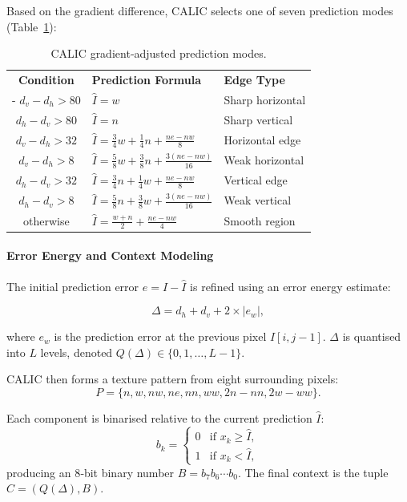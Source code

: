 Based on the gradient difference, CALIC selects one of seven prediction modes (Table~\ref{tab:calic_modes}):

\begin{table}[H]
\centering
\caption{CALIC gradient‑adjusted prediction modes.}
\label{tab:calic_modes}
\begin{tabular}{|c|l|l|}
\hline
\textbf{Condition} & \textbf{Prediction Formula} & \textbf{Edge Type} \\
-\hline 
\(d_v - d_h > 80\) & \(\hat{I} = w\) & Sharp horizontal \\
\(d_h - d_v > 80\) & \(\hat{I} = n\) & Sharp vertical \\
\(d_v - d_h > 32\) & \(\hat{I} = \frac{3}{4}w + \frac{1}{4}n + \frac{ne - nw}{8}\) & Horizontal edge \\
\(d_v - d_h > 8\)  & \(\hat{I} = \frac{5}{8}w + \frac{3}{8}n + \frac{3(ne - nw)}{16}\) & Weak horizontal \\
\(d_h - d_v > 32\) & \(\hat{I} = \frac{3}{4}n + \frac{1}{4}w + \frac{ne - nw}{8}\) & Vertical edge \\
\(d_h - d_v > 8\)  & \(\hat{I} = \frac{5}{8}n + \frac{3}{8}w + \frac{3(ne - nw)}{16}\) & Weak vertical \\
otherwise & \(\hat{I} = \frac{w + n}{2} + \frac{ne - nw}{4}\) & Smooth region \\
\hline
\end{tabular}
\end{table}

\paragraph{Error Energy and Context Modeling}
The initial prediction error \(e = I - \hat{I}\) is refined using an error energy estimate\cite{Wu1996}:

\[ 
\Delta = d_h + d_v + 2 \times |e_w|,
\]

where \(e_w\) is the prediction error at the previous pixel \(I[i, j-1]\). \(\Delta\) is quantised into \(L\) levels, denoted \(Q(\Delta) \in \{0,1,\ldots,L-1\}\).

CALIC then forms a texture pattern from eight surrounding pixels:
\[
P = \{n, w, nw, ne, nn, ww, 2n - nn, 2w - ww\}. 
\]

Each component is binarised relative to the current prediction  \(\hat{I}\):
\[
b_k = \begin{cases}
0 & \text{if } x_k \ge \hat{I},\\
1 & \text{if } x_k < \hat{I},
\end{cases} 
\]
producing an 8‑bit binary number \(B = b_7 b_6 \cdots b_0\). The final context is the tuple \(C = (Q(\Delta), B)\).

